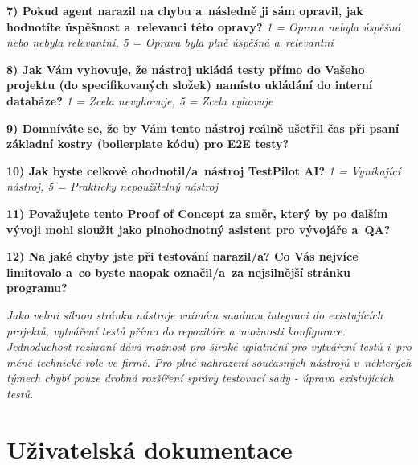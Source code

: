 \documentclass[czech, ing, kiv, he, iso690numb, viewonly]{fasthesis}
\begin{document}
\begin{tcolorbox}[breakable, colback=gray!3, colframe=black!35, boxrule=0.4pt, arc=2pt, title={Google Forms - export odpovědi}]
\textbf{7) Pokud agent narazil na chybu a~následně ji sám opravil, jak hodnotíte úspěšnost a~relevanci této opravy?}
\textit{1 = Oprava nebyla úspěšná nebo nebyla relevantní, 5 = Oprava byla plně úspěšná a~relevantní}

 \quad {} \quad {} \quad {} \quad {}

\textbf{8) Jak Vám vyhovuje, že nástroj ukládá testy přímo do Vašeho projektu (do specifikovaných složek) namísto ukládání do interní databáze?}
\textit{1 = Zcela nevyhovuje, 5 = Zcela vyhovuje}

 \quad {} \quad {} \quad {} \quad {}

\textbf{9) Domníváte se, že by Vám tento nástroj reálně ušetřil čas při psaní základní kostry (boilerplate kódu) pro E2E testy?}

 \quad {} \quad {} \quad {}

\textbf{10) Jak byste celkově ohodnotil/a~nástroj TestPilot AI?}
\textit{1 = Vynikající nástroj, 5 = Prakticky nepoužitelný nástroj}

 \quad {} \quad {} \quad {} \quad {}

\textbf{11) Považujete tento Proof of Concept za směr, který by po dalším vývoji mohl sloužit jako plnohodnotný asistent pro vývojáře a~QA?}

 \quad {} \quad {} \quad {}

\textbf{12) Na jaké chyby jste při testování narazil/a? Co Vás nejvíce limitovalo a~co byste naopak označil/a~za nejsilnější stránku programu?}

\textit{Jako velmi silnou stránku nástroje vnímám snadnou integraci do existujících projektů, vytváření testů přímo do repozitáře a~možnosti konfigurace. Jednoduchost rozhraní dává možnost pro široké uplatnění pro vytváření testů i~pro méně technické role ve firmě. Pro plné nahrazení současných nástrojů v~některých týmech chybí pouze drobná rozšíření správy testovací sady - úprava existujících testů.}

\end{tcolorbox}


\chapter{Uživatelská dokumentace}\label{app:userDocs}
\end{document}
